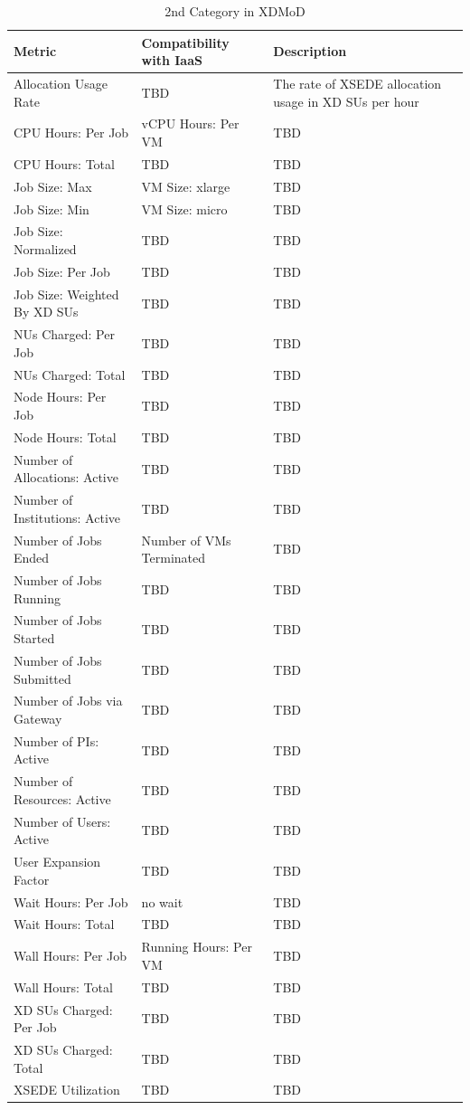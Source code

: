 \documentclass{sig-alternate-05-2015}
\begin{document}
\begin{table}[htb]
  \caption{2nd Category in XDMoD}
\begin{scriptsize}
\label{T:xdmod2}
 \begin{tabular}{l|l|l} 
Metric & Compatibility with IaaS & Description \\
\hline
Allocation Usage Rate & TBD & The rate of XSEDE allocation usage in XD SUs per hour \\
CPU Hours: Per Job  & vCPU Hours: Per VM & TBD \\
CPU Hours: Total  & TBD & TBD \\
Job Size: Max  & VM Size: xlarge & TBD \\
Job Size: Min  & VM Size: micro & TBD \\
Job Size: Normalized  & TBD & TBD \\
Job Size: Per Job  & TBD & TBD \\
Job Size: Weighted By XD SUs  & TBD & TBD \\
NUs Charged: Per Job  & TBD & TBD \\
NUs Charged: Total  & TBD & TBD \\
Node Hours: Per Job  & TBD & TBD \\
Node Hours: Total  & TBD & TBD \\
Number of Allocations: Active  & TBD & TBD \\
Number of Institutions: Active  & TBD & TBD \\
Number of Jobs Ended  & Number of VMs Terminated & TBD \\
Number of Jobs Running  & TBD & TBD \\
Number of Jobs Started  & TBD & TBD \\
Number of Jobs Submitted  & TBD & TBD \\
Number of Jobs via Gateway  & TBD & TBD \\
Number of PIs: Active  & TBD & TBD \\
Number of Resources: Active  & TBD & TBD \\
Number of Users: Active  & TBD & TBD \\
User Expansion Factor  & TBD & TBD \\
Wait Hours: Per Job  & no wait & TBD \\
Wait Hours: Total  & TBD & TBD \\
Wall Hours: Per Job  & Running Hours: Per VM & TBD \\
Wall Hours: Total  & TBD & TBD \\
XD SUs Charged: Per Job  & TBD & TBD \\
XD SUs Charged: Total  & TBD & TBD \\
XSEDE Utilization  & TBD & TBD \\
\hline
\end{tabular}\\
\end{scriptsize}
\end{table}
\end{document}
